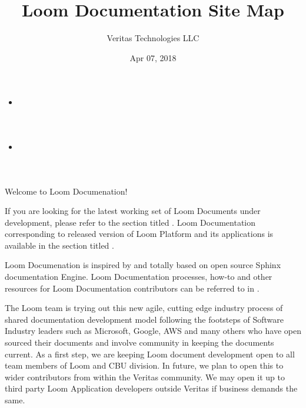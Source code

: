 \documentclass[letterpaper,10pt,english]{sphinxmanual}
\title{Loom Documentation Site Map}
\date{Apr 07, 2018}
\author{Veritas Technologies LLC}
\begin{document}
\maketitle
\sphinxtableofcontents
{}\label{\detokenize{loom_topindex::doc}}


\begin{sphinxShadowBox}
\begin{itemize}
\item {} 
\label{\detokenize{loom_topindex:id1}}{\hyperref[\detokenize{loom_topindex:released-loom-documenatation}]{}}

\item {} 
\label{\detokenize{loom_topindex:id2}}{\hyperref[\detokenize{loom_topindex:latest-loom-documents-under-development}]{}}

\end{itemize}
\end{sphinxShadowBox}

Welcome to Loom Documenation!

If you are looking for the latest working set of Loom Documents under development, please refer to the section titled {\hyperref[\detokenize{loom_topindex:loom-latest-docset}]{}}.  Loom Documentation corresponding to released version of Loom Platform and its applications is available in the section titled {\hyperref[\detokenize{loom_topindex:loom-release-docset}]{}}.

Loom Documenation is inspired by and totally based on open source Sphinx documentation Engine.  Loom Documentation processes, how-to and other resources for Loom Documentation contributors can be referred to in .

The Loom team is trying out this new agile, cutting edge industry process of shared documentation development model following the footsteps of Software Industry leaders such as Microsoft, Google, AWS and many others who have open sourced their documents and involve community in keeping the documents current.  As a first step, we are keeping Loom document development open to all team members of Loom and CBU division.  In future, we plan to open this to wider contributors from within the Veritas community.  We may open it up to third party Loom Application developers outside Veritas if business demands the same.
\end{document}
